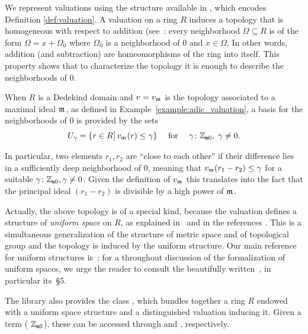 \documentclass[sigplan,10pt, nonacm, review]{acmart}
\begin{document}
We represent valuations using the \href{https://leanprover-community.github.io/mathlib_docs/ring_theory/valuation/basic.html#valuation}{\extlink} structure
available in \mathlib, which encodes Definition \ref{def:valuation}. A valuation on a ring $R$ induces a topology that is homogeneous with respect to addition (see~\cite[Chapitre~III,\S1]{Bou71}: every neighborhood $\Omega\subseteq R$ is of the form $\Omega=x+\Omega_0$ where $\Omega_0$ is a neighborhood of $0$ and $x\in\Omega$. In other words, addition (and subtraction) are homeomorphisms of the ring into itself. This property shows that to characterize the topology it is enough to describe the neighborhoods of $0$.
 
 When $R$ is a Dedekind domain and $v=v_{\maxid[\empty]}$ is the topology associated to a maximal ideal $\maxid[\empty]$, as defined in Example~\ref{example:adic_valuation}, 
 a basis for the neighborhoods of $0$ is provided by the sets
 \[
 U_\gamma = \{r \in R \big\vert\,v_{\maxid[\empty]}(r)\leq \gamma\}\quad\text{ for }\quad\gamma \colon \wzmZZ,\; \gamma \ne 0.
 \]

 In particular, two elements $r_1,r_2$ are ``close to each other'' %
 if their difference lies in a sufficiently deep neighborhood of $0$, meaning that $v_{\maxid[\empty]}(r_1-r_2)\leq \gamma$ for a suitable $ \gamma \colon \mathbb{Z}_{\mathtt{m}0}, \gamma \ne 0$. Given the definition of $v_{\maxid[\empty]}$ this translates into the fact that the principal ideal $(r_1-r_2)$ is divisible by a high power of $\maxid[\empty]$.

Actually, the above topology is of a special kind, because the valuation defines a structure of \emph{uniform space} on $R$, as explained in~\cite[Chapitre~VI, \S5]{Bou85} and in the references \ibid. This is a simultaneous generalization of the structure of metric space and of topological group and the topology is induced by the uniform structure. Our main reference for uniform structures is~\cite[Chapitre~II]{Bou71}; for a throughout discussion of the formalization of uniform spaces, we urge the reader to consult the  beautifully written~\cite{BuzComMas20}, in particular its~\S5.
 
The \mathlib library also provides the class \href{https://leanprover-community.github.io/mathlib_docs/topology/algebra/valuation.html#valued}{\extlink}, which bundles together a ring $R$ endowed with a uniform space structure and a distinguished valuation inducing it. Given a term  ( $\mathbb{Z}_{\mathtt{m}0}$), these can be accessed through  and , respectively.
\end{document}
